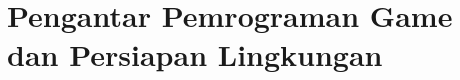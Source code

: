 \documentclass[../../main.tex]{subfiles}
\begin{document}
\chapter{Pengantar Pemrograman Game dan Persiapan Lingkungan}
\label{chap:persiapan-lingkungan}
























\ifSubfilesClassLoaded{%
  \clearpage
}{}
\end{document}
